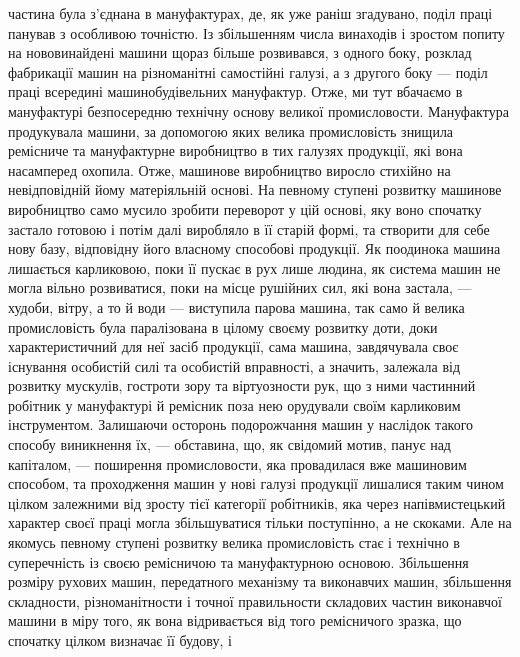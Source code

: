 \parcont{}  %
частина була з’єднана в мануфактурах, де, як уже раніш згадувано,
поділ праці панував з особливою точністю. Із збільшенням числа
винаходів і зростом попиту на нововинайдені машини щораз
більше розвивався, з одного боку, розклад фабрикації машин на
різноманітні самостійні галузі, а з другого боку — поділ праці
всередині машинобудівельних мануфактур. Отже, ми тут вбачаємо
в мануфактурі безпосередню технічну основу великої промисловости.
Мануфактура продукувала машини, за допомогою яких
велика промисловість знищила ремісниче та мануфактурне виробництво
в тих галузях продукції, які вона насамперед охопила.
Отже, машинове виробництво виросло стихійно на невідповідній
йому матеріяльній основі. На певному ступені розвитку машинове
виробництво само мусило зробити переворот у цій основі, яку воно
спочатку застало готовою і потім далі виробляло в її старій формі,
та створити для себе нову базу, відповідну його власному способові
продукції. Як поодинока машина лишається карликовою, поки
її пускає в рух лише людина, як система машин не могла вільно
розвиватися, поки на місце рушійних сил, які вона застала, —
худоби, вітру, а то й води — виступила парова машина, так само
й велика промисловість була паралізована в цілому своєму розвитку
доти, доки характеристичний для неї засіб продукції,
сама машина, завдячувала своє існування особистій силі та особистій
вправності, а значить, залежала від розвитку мускулів,
гостроти зору та віртуозности рук, що з ними частинний робітник
у мануфактурі й ремісник поза нею орудували своїм карликовим
інструментом. Залишаючи осторонь подорожчання машин у
наслідок такого способу виникнення їх, — обставина, що, як свідомий
мотив, панує над капіталом, — поширення промисловости,
яка провадилася вже машиновим способом, та проходження машин
у нові галузі продукції лишалися таким чином цілком залежними
від зросту тієї категорії робітників, яка через напівмистецький
характер своєї праці могла збільшуватися тільки поступінно,
а не скоками. Але на якомусь певному ступені розвитку велика
промисловість стає і технічно в суперечність із своєю ремісничою
та мануфактурною основою. Збільшення розміру рухових
машин, передатного механізму та виконавчих машин, збільшення
складности, різноманітности і точної правильности складових
частин виконавчої машини в міру того, як вона відривається від
того ремісничого зразка, що спочатку цілком визначає її будову, і
